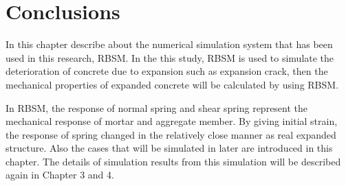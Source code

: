 







\section{Conclusions}

In this chapter describe about the numerical simulation system that has been used in this research, RBSM. In the this study, RBSM is used to simulate the deterioration of concrete due to expansion such as expansion crack, then the mechanical properties of expanded concrete will be calculated by using RBSM.

In RBSM, the response of normal spring and shear spring represent the mechanical response of mortar and aggregate member. By giving initial strain, the response of spring changed in the relatively close manner as real expanded structure. Also the cases that will be simulated in later are introduced in this chapter. The details of simulation results from this simulation will be described again in Chapter 3 and 4.
